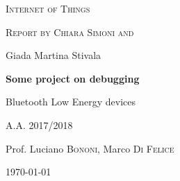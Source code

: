\documentclass[12pt,a4paper]{report}
\begin{document}
	\begin{titlepage}
		\centering
			{\scshape\LARGE Internet of Things \par}
			\vspace{1cm}
			{\scshape\Large Report by Chiara Simoni and
				
				Giada Martina Stivala \par}
			\vspace{1.5cm}
			{\huge\bfseries Some project on debugging
				
				Bluetooth Low Energy devices\par}
			\vspace{2cm} \par
		\vfill
		A.A. 2017/2018\par
		Prof. Luciano \textsc{Bononi}, Marco \textsc{Di Felice}
		\vfill
		
		{\large \today\par}
	\end{titlepage}
\end{document}
